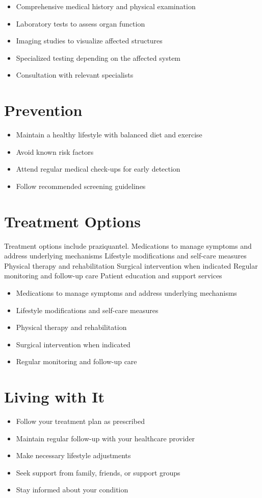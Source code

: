 \begin{itemize}[noitemsep]
  \item Comprehensive medical history and physical examination
  \item Laboratory tests to assess organ function
  \item Imaging studies to visualize affected structures
  \item Specialized testing depending on the affected system
  \item Consultation with relevant specialists
\end{itemize}
\section{Prevention}
\begin{itemize}[noitemsep]
  \item Maintain a healthy lifestyle with balanced diet and exercise
  \item Avoid known risk factors
  \item Attend regular medical check-ups for early detection
  \item Follow recommended screening guidelines
\end{itemize}
\section{Treatment Options}
Treatment options include praziquantel. Medications to manage symptoms and address underlying mechanisms Lifestyle modifications and self-care measures Physical therapy and rehabilitation Surgical intervention when indicated Regular monitoring and follow-up care Patient education and support services

\begin{itemize}[noitemsep]
  \item Medications to manage symptoms and address underlying mechanisms
  \item Lifestyle modifications and self-care measures
  \item Physical therapy and rehabilitation
  \item Surgical intervention when indicated
  \item Regular monitoring and follow-up care
\end{itemize}
\section{Living with It}
\begin{itemize}[noitemsep]
  \item Follow your treatment plan as prescribed
  \item Maintain regular follow-up with your healthcare provider
  \item Make necessary lifestyle adjustments
  \item Seek support from family, friends, or support groups
  \item Stay informed about your condition
\end{itemize}
